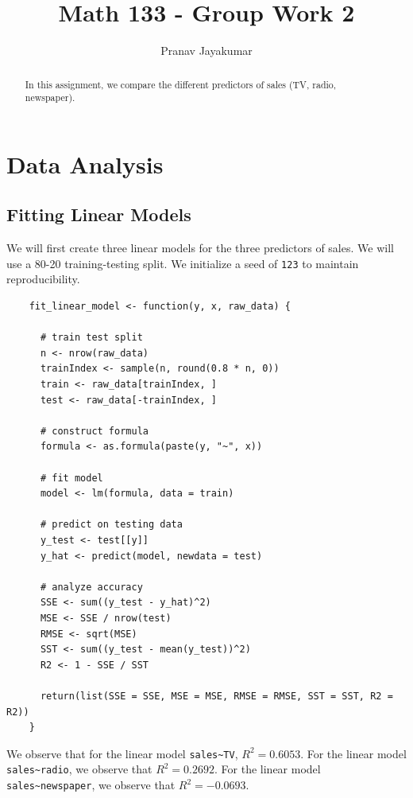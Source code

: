 \documentclass{article}
\title{Math 133 - Group Work 2}
\author{Pranav Jayakumar}
\theoremstyle{mytheoremstyle}
\theoremstyle{mytheoremstyle}
\theoremstyle{myproblemstyle}
\begin{document}
    \maketitle
    \begin{abstract}
      In this assignment, we compare the different predictors of sales (TV, radio, newspaper). 
    \end{abstract}

    \section{Data Analysis}
    \vspace{0.1in}
    \subsection{Fitting Linear Models}

    We will first create three linear models for the three predictors of sales. We will use a 80-20 training-testing split. We initialize a seed of \verb|123| to maintain reproducibility.
    \vspace{0.1in}
    \begin{lstlisting}
    fit_linear_model <- function(y, x, raw_data) {

      # train test split
      n <- nrow(raw_data)
      trainIndex <- sample(n, round(0.8 * n, 0))
      train <- raw_data[trainIndex, ]
      test <- raw_data[-trainIndex, ]
  
      # construct formula
      formula <- as.formula(paste(y, "~", x))
  
      # fit model
      model <- lm(formula, data = train)
  
      # predict on testing data
      y_test <- test[[y]]
      y_hat <- predict(model, newdata = test)
  
      # analyze accuracy
      SSE <- sum((y_test - y_hat)^2)
      MSE <- SSE / nrow(test)  
      RMSE <- sqrt(MSE)
      SST <- sum((y_test - mean(y_test))^2)
      R2 <- 1 - SSE / SST
  
      return(list(SSE = SSE, MSE = MSE, RMSE = RMSE, SST = SST, R2 = R2))
    }
    \end{lstlisting}

    We observe that for the linear model \verb|sales~TV|, $R^2 = 0.6053$. For the linear model \verb|sales~radio|, we observe that $R^2 = 0.2692$. 
    For the linear model \verb|sales~newspaper|, we observe that $R^2 = -0.0693$. 
    \vspace{0.1in}
\end{document}
